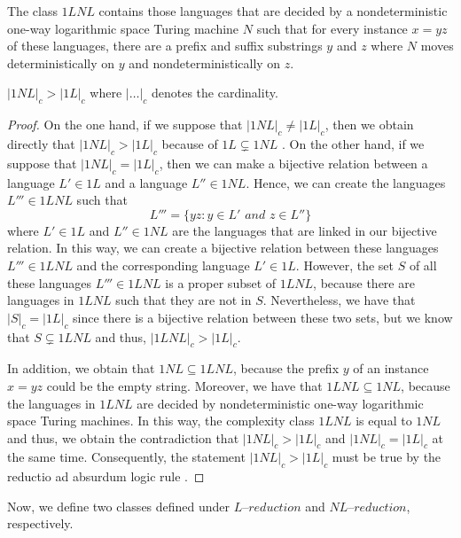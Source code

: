 \documentclass[a4paper,UKenglish,cleveref, autoref]{lipics-v2019}
\begin{document}
\begin{definition}
The class $1LNL$ contains those languages that are decided by a nondeterministic one-way logarithmic space Turing machine $N$ such that for every instance $x = yz$ of these languages, there are a prefix and suffix substrings $y$ and $z$ where $N$ moves deterministically on $y$ and nondeterministically on $z$.
\end{definition}

\begin{theorem}
\label{partially}
$|1NL|_{c} > |1L|_{c}$ where $|\ldots|_{c}$ denotes the cardinality.
\end{theorem}

\begin{proof}
On the one hand, if we suppose that $|1NL|_{c} \neq |1L|_{c}$, then we obtain directly that $|1NL|_{c} > |1L|_{c}$ because of $1L \varsubsetneq 1NL$ \cite{HM81}. On the other hand, if we suppose that $|1NL|_{c} = |1L|_{c}$, then we can make a bijective relation between a language $L' \in 1L$ and a language $L'' \in 1NL$. Hence, we can create the languages $L''' \in 1LNL$ such that
\[L''' =\{yz: y \in L' \textit{ and } z \in L''\}\]
where  $L' \in 1L$ and $L'' \in 1NL$ are the languages that are linked in our bijective relation. In this way, we can create a bijective relation between these languages $L''' \in 1LNL$ and the corresponding language $L' \in 1L$. However, the set $S$ of all these languages $L''' \in 1LNL$ is a proper subset of $1LNL$, because there are languages in $1LNL$ such that they are not in $S$. Nevertheless, we have that $|S|_{c} = |1L|_{c}$ since there is a bijective relation between these two sets, but we know that $S \varsubsetneq 1LNL$ and thus, $|1LNL|_{c} > |1L|_{c}$. 

In addition, we obtain that $1NL \subseteq 1LNL$, because the prefix $y$ of an instance $x = yz$ could be the empty string. Moreover, we have that $1LNL \subseteq 1NL$, because the languages in $1LNL$ are decided by nondeterministic one-way logarithmic space Turing machines. In this way, the complexity class $1LNL$ is equal to $1NL$ and thus, we obtain the contradiction that $|1NL|_{c} > |1L|_{c}$ and $|1NL|_{c} = |1L|_{c}$ at the same time. Consequently, the statement $|1NL|_{c} > |1L|_{c}$ must be true by the reductio ad absurdum logic rule \cite{FE16}.
\end{proof}

Now, we define two classes defined under $\textit{L--reduction}$ and $\textit{NL--reduction}$, respectively.
\end{document}
